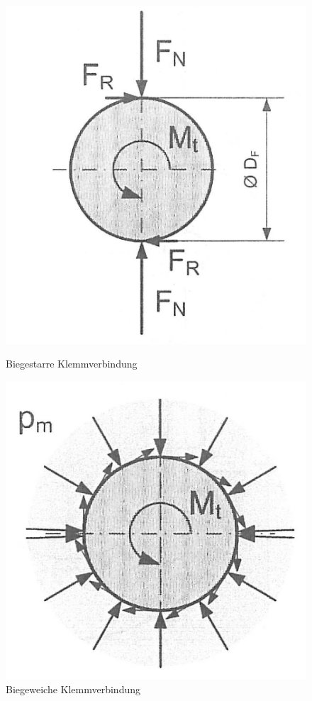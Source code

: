 \begin{figure}[H]
	\centering
	\begin{minipage}[b]{0.49\linewidth}
		\includegraphics[width=\linewidth]{kupplungen/klemmverbindung-starr}
		\caption*{Biegestarre Klemmverbindung}
	\end{minipage}
		\begin{minipage}[b]{0.49\linewidth}
		\includegraphics[width=\linewidth]{kupplungen/klemmverbindung-weich}
		\caption*{Biegeweiche Klemmverbindung}
	\end{minipage}
\end{figure}


